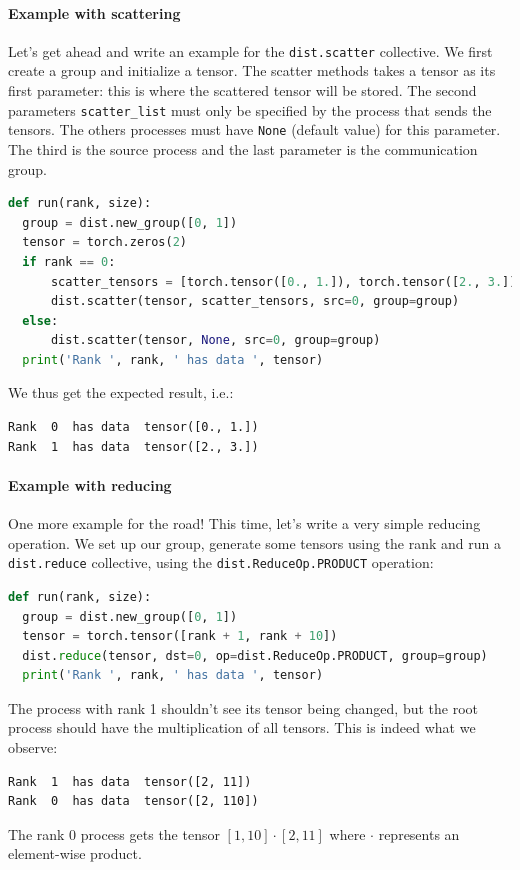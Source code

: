 \documentclass{article}
\begin{document}
\paragraph{Example with scattering}
Let's get ahead and write an example for the \lstinline{dist.scatter} collective. We first create a group and initialize a tensor. The scatter methods takes a tensor as its first parameter: this is where the scattered tensor will be stored. The second parameters \lstinline{scatter_list} must only be specified by the process that sends the tensors. The others processes must have \lstinline{None} (default value) for this parameter. The third is the source process and the last parameter is the communication group.

\begin{lstlisting}[language=Python]
def run(rank, size):
  group = dist.new_group([0, 1])
  tensor = torch.zeros(2)
  if rank == 0:
      scatter_tensors = [torch.tensor([0., 1.]), torch.tensor([2., 3.])]
      dist.scatter(tensor, scatter_tensors, src=0, group=group)
  else:
      dist.scatter(tensor, None, src=0, group=group)
  print('Rank ', rank, ' has data ', tensor)
\end{lstlisting}
We thus get the expected result, i.e.:
\begin{lstlisting}
Rank  0  has data  tensor([0., 1.])
Rank  1  has data  tensor([2., 3.])
\end{lstlisting}

\paragraph{Example with reducing}
One more example for the road! This time, let's write a very simple reducing operation. We set up our group, generate some tensors using the rank and run a \lstinline{dist.reduce} collective, using the \lstinline{dist.ReduceOp.PRODUCT} operation:
\begin{lstlisting}[language=Python]
def run(rank, size):
  group = dist.new_group([0, 1])
  tensor = torch.tensor([rank + 1, rank + 10])
  dist.reduce(tensor, dst=0, op=dist.ReduceOp.PRODUCT, group=group)
  print('Rank ', rank, ' has data ', tensor)
\end{lstlisting}
The process with rank 1 shouldn't see its tensor being changed, but the root process should have the multiplication of all tensors. This is indeed what we observe:
\begin{lstlisting}
Rank  1  has data  tensor([2, 11])
Rank  0  has data  tensor([2, 110])
\end{lstlisting}
The rank 0 process gets the tensor \([1, 10]\cdot [2, 11]\) where \(\cdot \) represents an element-wise product.
\end{document}
